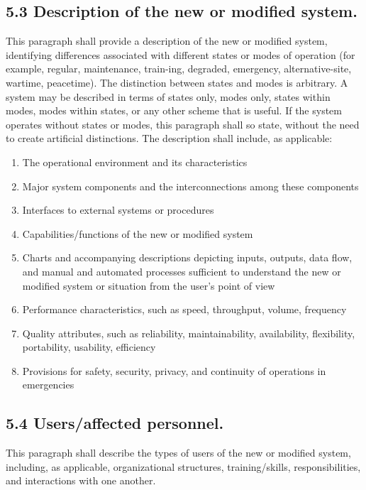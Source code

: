 \subsection{5.3 Description of the new or modified system.}

This paragraph shall provide a description of the new or modified
system, identifying differences associated with different states or
modes of operation (for example, regular, maintenance, train-ing,
degraded, emergency, alternative-site, wartime, peacetime). The
distinction between states and modes is arbitrary. A system may be
described in terms of states only, modes only, states within modes,
modes within states, or any other scheme that is useful. If the system
operates without states or modes, this paragraph shall so state, without
the need to create artificial distinctions. The description shall
include, as applicable:

\begin{enumerate}
\itemsep1pt\parskip0pt
\item
  The operational environment and its characteristics
\item
  Major system components and the interconnections among these
  components
\item
  Interfaces to external systems or procedures
\item
  Capabilities/functions of the new or modified system
\item
  Charts and accompanying descriptions depicting inputs, outputs, data
  flow, and manual and automated processes sufficient to understand the
  new or modified system or situation from the user's point of view
\item
  Performance characteristics, such as speed, throughput, volume,
  frequency
\item
  Quality attributes, such as reliability, maintainability,
  availability, flexibility, portability, usability, efficiency
\item
  Provisions for safety, security, privacy, and continuity of operations
  in emergencies
\end{enumerate}

\subsection{5.4 Users/affected personnel.}

This paragraph shall describe the types of users of the new or modified
system, including, as applicable, organizational structures,
training/skills, responsibilities, and interactions with one another.

